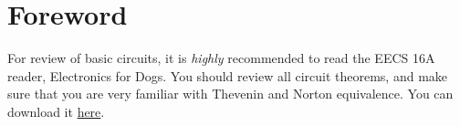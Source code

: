 \section*{Foreword}
For review of basic circuits, it is \emph{highly} recommended to read the EECS 16A reader, Electronics for Dogs.  You should review all circuit theorems, and make sure that you are very familiar with Thevenin and Norton equivalence.  You can download it \href{http://rfic.eecs.berkeley.edu/~niknejad/edogs.html}{here}.